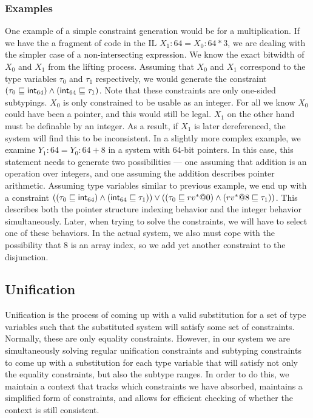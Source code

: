 \subsubsection{Examples}
One example of a simple constraint generation would be for a multiplication. If we have the a fragment of code in the IL $X_1:64 = X_0:64 * 3$, we are dealing with the simpler case of a non-intersecting expression. We know the exact bitwidth of $X_0$ and $X_1$ from the lifting process. Assuming that $X_0$ and $X_1$ correspond to the type variables $\tau_0$ and $\tau_1$ respectively, we would generate the constraint $(\tau_0 \sqsubseteq \mathsf{int}_{64}) \wedge (\mathsf{int}_{64} \sqsubseteq \tau_1)$. Note that these constraints are only one-sided subtypings. $X_0$ is only constrained to be usable as an integer. For all we know $X_0$ could have been a pointer, and this would still be legal. $X_1$ on the other hand must be definable by an integer. As a result, if $X_1$ is later dereferenced, the system will find this to be inconsistent. In a slightly more complex example, we examine $Y_1:64 = Y_0:64 + 8$ in a system with 64-bit pointers. In this case, this statement needs to generate two possibilities --- one assuming that addition is an operation over integers, and one assuming the addition describes pointer arithmetic. Assuming type variables similar to previous example, we end up with a constraint $((\tau_0 \sqsubseteq \mathsf{int}_{64}) \wedge (\mathsf{int}_{64} \sqsubseteq \tau_1)) \vee ((\tau_0 \sqsubseteq rv^*@0) \wedge (rv^*@8 \sqsubseteq \tau_1))$. This describes both the pointer structure indexing behavior and the integer behavior simultaneously. Later, when trying to solve the constraints, we will have to select one of these behaviors. In the actual system, we also must cope with the possibility that $8$ is an array index, so we add yet another constraint to the disjunction.

\subsection{Unification}
Unification is the process of coming up with a valid substitution for a set of type variables such that the substituted system will satisfy some set of constraints. Normally, these are only equality constraints. However, in our system we are simultaneously solving regular unification constraints and subtyping constraints to come up with a substitution for each type variable that will satisfy not only the equality constraints, but also the subtype ranges. In order to do this, we maintain a context that tracks which constraints we have absorbed, maintains a simplified form of constraints, and allows for efficient checking of whether the context is still consistent.

